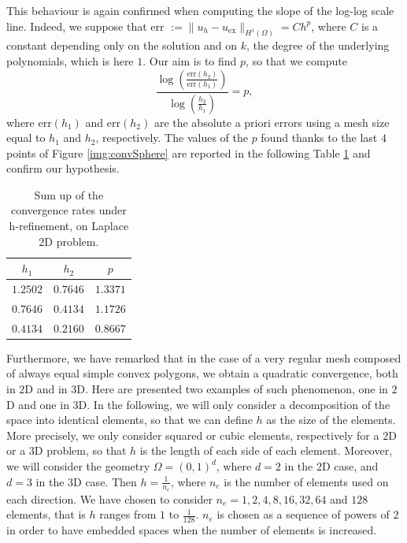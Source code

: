 This behaviour is again confirmed when computing the slope of the log-log scale line. Indeed, we suppose that err $:=\|u_h-u_\text{ex}\|_{H^1(\Omega)} = Ch^p$, where $C$ is a constant depending only on the solution and on $k$, the degree of the underlying polynomials, which is here $1$. Our aim is to find $p$, so that we compute 
\begin{equation}\label{ploglog}
\frac{\log\left(\frac{\text{err}(h_2)}{\text{err}(h_1)}\right)}{\log\left(\frac{h_2}{h_1}\right)}=p,
\end{equation}
where err$(h_1)$ and err$(h_2)$ are the absolute a priori errors using a mesh size equal to $h_1$ and $h_2$, respectively. The values of the $p$ found thanks to the last $4$ points of Figure \ref{img:convSphere} are reported in the following Table \ref{tableSphere} and confirm our hypothesis. \\

\begin{table}[h!]
\begin{center}
\begin{tabular}{|c|c|c|}
\hline
$h_1$ & $h_2$ & $p$ \\
\hline
$1.2502$ & $0.7646$ & $1.3371$\\
\hline
$0.7646$ & $0.4134$ & $1.1726$\\
\hline
$0.4134$ & $0.2160$ & $0.8667$\\
\hline
\end{tabular}
\end{center}
\caption{Sum up of the convergence rates under h-refinement, on Laplace $2$D problem.} \label{tableSphere}
\end{table}

Furthermore, we have remarked that in the case of a very regular mesh composed of always equal simple convex polygons, we obtain a quadratic convergence, both in $2$D and in $3$D. Here are presented two examples of such phenomenon, one in $2$D and one in $3$D. 
In the following, we will only consider a decomposition of the space into identical elements, so
that we can define $h$ as the size of the elements. More precisely, we only consider squared or cubic elements, respectively for a $2$D or a $3$D problem, so that $h$ is the length of each side of each element.
Moreover, we will consider the geometry $\Omega=(0,1)^d$, where $d=2$ in the $2$D case, and $d=3$ in the $3$D case. Then $h=\frac{1}{n_e}$, where $n_e$ is the number of elements used on each direction. We have chosen to consider $n_e=1, 2, 4, 8, 16, 32, 64$ and $128$ elements, that is $h$ ranges from $1$ to $\frac{1}{128}$. $n_e$ is chosen as a sequence of powers of $2$ in order to have embedded spaces when the number of elements is increased.\\

